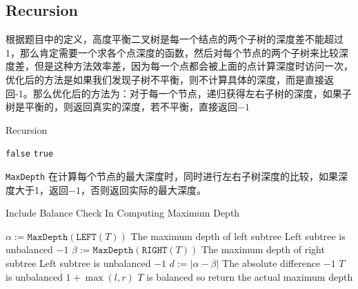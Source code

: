  \subsection{Recursion}
根据题目中的定义，高度平衡二叉树是每一个结点的两个子树的深度差不能超过1，那么肯定需要一个求各个点深度的函数，然后对每个节点的两个子树来比较深度差，但是这种方法效率差，因为每一个点都会被上面的点计算深度时访问一次，优化后的方法是如果我们发现子树不平衡，则不计算具体的深度，而是直接返回-1。那么优化后的方法为：对于每一个节点，递归获得左右子树的深度，如果子树是平衡的，则返回真实的深度，若不平衡，直接返回$-1$
\setcounter{algorithm}{0}
\begin{algorithm}[H]
\caption{Recursion}
\begin{algorithmic}[1]
\State \Return \texttt{false}
\EndIf
\State \Return \texttt{true}
\EndProcedure
\end{algorithmic}
\end{algorithm}
\begin{CJK*}{UTF8}{gbsn}
\texttt{MaxDepth} 在计算每个节点的最大深度时，同时进行左右子树深度的比较，如果深度大于1，返回$-1$，否则返回实际的最大深度。
\end{CJK*}
\begin{algorithm}[H]
\caption{Include Balance Check In Computing Maximum Depth}
\begin{algorithmic}[1]
\State {}
\EndIf
\State $\alpha:=\texttt{MaxDepth}(\texttt{LEFT}(T))$ \Comment The maximum depth of left subtree
 \Comment Left subtree is unbalanced
\State \Return $-1$
\EndIf
\State $\beta:=\texttt{MaxDepth}(\texttt{RIGHT}(T))$ \Comment The maximum depth of right subtree
 \Comment Left subtree is unbalanced
\State \Return $-1$
\EndIf
\State $d:=|\alpha-\beta|$ \Comment The absolute difference
\State \Return $-1$ \Comment $T$ is unbalanced
\EndIf
\State \Return $1+\max(l, r)$ \Comment $T$ is balanced so return the actual maximum depth
\end{algorithmic}
\end{algorithm}
\begin{algorithm}[H]
\begin{algorithmic}[1]
\EndFunction
\end{algorithmic}
\end{algorithm}